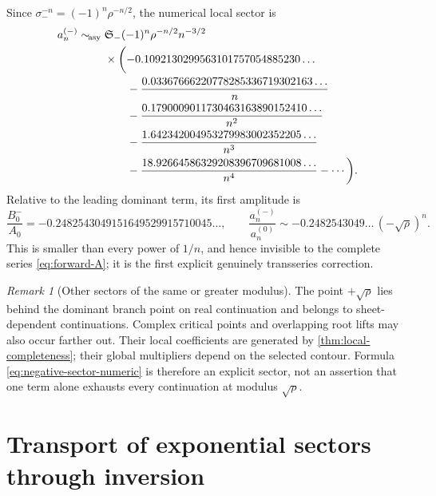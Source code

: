 \documentclass[11pt,a4paper,oneside,openany]{book}
\theoremstyle{definition}
\theoremstyle{remark}
\newtheorem{remark}[theorem]{Remark}
\newcommand{\asympseries}{\sim_{\!\mathrm{asy}}}
\newcommand{\Stokes}{\mathfrak S}
\begin{document}
Since $\sigma_-^{-n}=(-1)^n\rho^{-n/2}$, the numerical local sector is
\begin{align}
 a_n^{(-)}\asympseries{}&
 \Stokes_-(-1)^n\rho^{-n/2}n^{-3/2}\notag\\
 &\times\biggl(-0.1092130299563101757054885230\ldots\notag\\
 &\qquad-\frac{0.03367666220778285336719302163\ldots}{n}\notag\\
 &\qquad-\frac{0.1790009011730463163890152410\ldots}{n^2}\notag\\
 &\qquad-\frac{1.642342004953279983002352205\ldots}{n^3}\notag\\
 &\qquad-\frac{18.92664586329208396709681008\ldots}{n^4}
 -\cdots\biggr).
 \label{eq:negative-sector-numeric}
\end{align}
Relative to the leading dominant term, its first amplitude is
\begin{equation}
 \frac{B_0^-}{A_0}=-0.2482543049151649529915710045\ldots,
 \qquad
 \frac{a_n^{(-)}}{a_n^{(0)}}
 \sim -0.2482543049\ldots\,(-\sqrt\rho)^n.
 \label{eq:negative-relative}
\end{equation}
This is smaller than every power of $1/n$, and hence invisible to the complete
series \cref{eq:forward-A}; it is the first explicit genuinely transseries
correction.

\begin{remark}[Other sectors of the same or greater modulus]
The point $+\sqrt\rho$ lies behind the dominant branch point on real
continuation and belongs to sheet-dependent continuations.  Complex critical
points and overlapping root lifts may also occur farther out.  Their local
coefficients are generated by \cref{thm:local-completeness}; their global
multipliers depend on the selected contour.  Formula
\cref{eq:negative-sector-numeric} is therefore an explicit sector, not an
assertion that one term alone exhausts every continuation at modulus
$\sqrt\rho$.
\end{remark}

\chapter{Transport of exponential sectors through inversion}
\label{ch:inverse-sectors}
\end{document}
